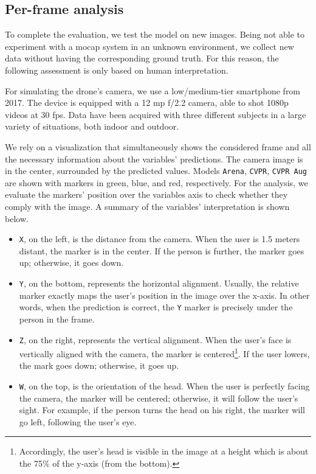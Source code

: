\subsection{Per-frame analysis}
\label{subsec:ql-interactive}

To complete the evaluation, we test the model on new images. Being not able to experiment with a \gls{mocap} system in an unknown environment, we collect new data without having the corresponding ground truth. For this reason, the following assessment is only based on human interpretation.

For simulating the drone's camera, we use a low/medium-tier smartphone from 2017. The device is equipped with a 12 \gls{mp} f/2.2 camera, able to shot 1080p videos at 30 \gls{fps}. Data have been acquired with three different subjects in a large variety of situations, both indoor and outdoor.

We rely on a visualization that simultaneously shows the considered frame and all the necessary information about the variables' predictions. The camera image is in the center, surrounded by the predicted values. Models \texttt{Arena}, \texttt{CVPR}, \texttt{CVPR Aug} are shown with markers in green, blue, and red, respectively. For the analysis, we evaluate the markers' position over the variables axis to check whether they comply with the image. A summary of the variables' interpretation is shown below.

\begin{itemize}
    \item \texttt{X}, on the left, is the distance from the camera. When the user is 1.5 meters distant, the marker is in the center. If the person is further, the marker goes up; otherwise, it goes down.
    \item \texttt{Y}, on the bottom, represents the horizontal alignment. Usually, the relative marker exactly maps the user's position in the image over the x-axis. In other words, when the prediction is correct, the \texttt{Y} marker is precisely under the person in the frame.
    \item \texttt{Z}, on the right, represents the vertical alignment. When the user's face is vertically aligned with the camera, the marker is centered\footnote{Accordingly, the user's head is visible in the image at a height which is about the 75\% of the y-axis (from the bottom).}. If the user lowers, the mark goes down; otherwise, it goes up.
    \item \texttt{W}, on the top, is the orientation of the head. When the user is perfectly facing the camera, the marker will be centered; otherwise, it will follow the user's sight. For example, if the person turns the head on his right, the marker will go left, following the user's eye.
\end{itemize}

